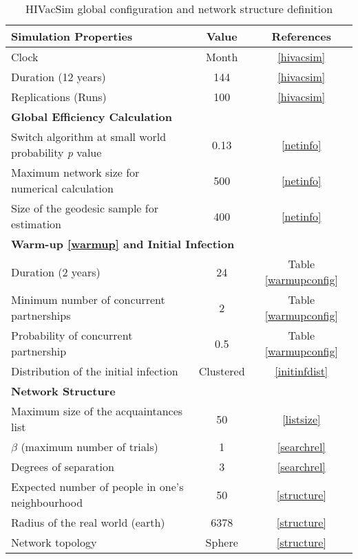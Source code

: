 \begin{longtable}[c]{|p{10cm}|c|c|}
\caption{HIVacSim global configuration and network structure definition}\\\hline
\label{hivacsimconfig}
\textbf{Simulation Properties}     & \textbf{Value} & \textbf{References}  \\\hline
Clock                                       & Month & \ref{hivacsim} \\\hline
Duration (12 years)                         & 144   & \ref{hivacsim} \\\hline
Replications (Runs)                         & 100   & \ref{hivacsim} \\\hline
\multicolumn{3}{|l|}{\textbf{Global Efficiency Calculation}}\\\hline
Switch algorithm at small world probability \emph{p} value & 0.13      & \ref{netinfo}\\\hline
Maximum network size for numerical calculation      & 500       & \ref{netinfo}\\\hline
Size of the geodesic sample for estimation          & 400       & \ref{netinfo}\\\hline
\multicolumn{3}{|l|}{\textbf{Warm-up \ref{warmup} and Initial Infection}}\\\hline
Duration (2 years)                                  & 24     & Table \ref{warmupconfig} \\\hline
Minimum number of concurrent partnerships           & 2      & Table \ref{warmupconfig} \\\hline
Probability of concurrent partnership               & 0.5    & Table \ref{warmupconfig} \\\hline
Distribution of the initial infection               & Clustered & \ref{initinfdist}\\\hline
\multicolumn{3}{|l|}{\textbf{Network Structure}}\\\hline
Maximum size of the acquaintances list              & 50     & \ref{listsize}\\\hline
$\beta$ (maximum number of trials)                  & 1      & \ref{searchrel}\\\hline
Degrees of separation                               & 3      & \ref{searchrel}\\\hline
Expected number of people in one's neighbourhood    & 50     & \ref{structure}\\\hline
Radius of the real world (earth)                    & 6378   & \ref{structure}\\\hline
Network topology                                    & Sphere & \ref{structure}\\\hline
\end{longtable}


